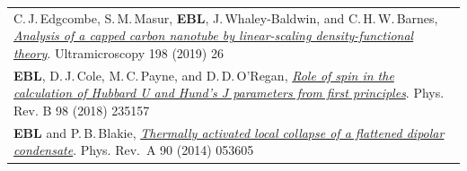 \documentclass[10pt,a4paper,final]{article}
\begin{document}
\begin{tabularx}{\textwidth}{
   X}
   C.\,J.\,Edgcombe, S.\,M.\,Masur, \textbf{EBL}, J.\,Whaley-Baldwin, and C.\,H.\,W.\,Barnes, \href{https://www.sciencedirect.com/science/article/pii/S0304399118302833}{\textit{Analysis of a capped carbon nanotube by linear-scaling density-functional theory}}. Ultramicroscopy 198 (2019) 26                                                                                                                                                                                                                                                                                                                                                                                                                                                                     \\ %
   \textbf{EBL}, D.\,J.\,Cole, M.\,C.\,Payne, and D.\,D.\,O'Regan, \href{https://journals.aps.org/prb/abstract/10.1103/PhysRevB.98.235157}{\textit{Role of spin in the calculation of Hubbard U and Hund’s J parameters from first principles}}. Phys. Rev. B 98 (2018) 235157                                                                                                                                                                                                                                                                                                                                                                                                                                                                                         \\ %
   \textbf{EBL} and P.\,B.\,Blakie, \href{https://journals.aps.org/pra/pdf/10.1103/PhysRevA.90.053605}{\textit{Thermally activated local collapse of a flattened dipolar condensate}}. Phys. Rev.~A 90 (2014) 053605                                                                                                                                                                                                                                                                                                                                                                                                                                                                                                                                                   \\ %
\end{tabularx}
\end{document}
